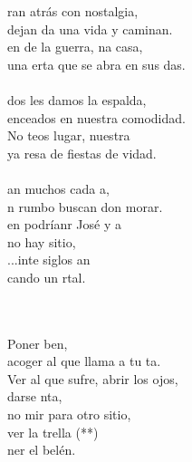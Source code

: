 \begin{cancion}%
	ran atrás con nostalgia,\\
	dejan da una vida y caminan.\\
	en de la guerra, na casa,\\
	una erta que se abra en sus das.\\
\jump\\
	dos les damos la espalda,\\
	enceados en nuestra comodidad.\\
	No teos lugar, nuestra \\
	ya resa de fiestas de vidad.\\
\jump\\
	an muchos cada a, \\
	n rumbo buscan don morar.\\
	en podríanr José y a\\
	no hay sitio,\\
	...inte siglos an\\
	cando un rtal.\\\jump\\
	\begin{chorus}%
	     \\
	Poner ben, \\
	acoger al que llama a tu ta.\\
Ver al que sufre, abrir los ojos,\\
	darse nta,\\
	no mir para otro sitio, \\
	ver la trella (**)\\
	ner el belén. \\
	\end{chorus}%
	\jump\\
	      \\

\end{cancion}

